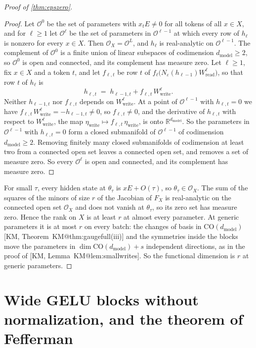 \documentclass[10pt]{article}
\makeatletter
\theoremstyle{definition}
\theoremstyle{remark}
\newcommand{\R}{\mathbb{R}}
\newcommand{\Wread}{W_{\mathrm{read}}}
\newcommand{\Wwrite}{W_{\mathrm{write}}}
\newcommand{\dm}{d_{\mathrm{model}}}
\newcommand{\CO}{\mathrm{CO}}
\newenvironment{nested}{\par\nopagebreak\def\FrameCommand{\hspace{0.5em}{\color{black!30}\vrule width 0.6pt}\hspace{1em}}\MakeFramed{\advance\hsize-\width\FrameRestore}}{\endMakeFramed}
\newcommand{\KMn}[1]{\csname KM@#1\endcsname}
\newcommand{\KM}[2]{[KM, #1~\KMn{#2}]}
\newcommand{\KMp}[3]{[KM, #1~\KMn{#2}(#3)]}
\makeatother
\begin{document}
\begin{proof}[Proof of \cref{thm:epszero}]
\begin{nested}
\begin{proof}
Let $\mathcal O^0$ be the set of parameters with $x_tE \neq 0$ for all tokens of all $x \in X$, and for $\ell \ge 1$ let $\mathcal O^\ell$ be the set of parameters in $\mathcal O^{\ell-1}$ at which every row of $h_\ell$ is nonzero for every $x \in X$. Then $\mathcal O_X = \mathcal O^L$, and $h_\ell$ is real-analytic on $\mathcal O^{\ell-1}$. The complement of $\mathcal O^0$ is a finite union of linear subspaces of codimension $\dm \ge 2$, so $\mathcal O^0$ is open and connected, and its complement has measure zero. Let $\ell \ge 1$, fix $x \in X$ and a token $t$, and let $f_{\ell,t}$ be row $t$ of $f_\ell\big(N_\varepsilon(h_{\ell-1})\Wread^{\ell}\big)$, so that row $t$ of $h_\ell$ is
\[
h_{\ell,t} \;=\; h_{\ell-1,t} + f_{\ell,t}\,\Wwrite^{\ell} .
\]
Neither $h_{\ell-1,t}$ nor $f_{\ell,t}$ depends on $\Wwrite^{\ell}$. At a point of $\mathcal O^{\ell-1}$ with $h_{\ell,t} = 0$ we have $f_{\ell,t}\,\Wwrite^{\ell} = -h_{\ell-1,t} \neq 0$, so $f_{\ell,t} \neq 0$, and the derivative of $h_{\ell,t}$ with respect to $\Wwrite^{\ell}$, the map $\eta_{\mathrm{write}} \mapsto f_{\ell,t}\,\eta_{\mathrm{write}}$, is onto $\R^{\dm}$. So the parameters in $\mathcal O^{\ell-1}$ with $h_{\ell,t} = 0$ form a closed submanifold of $\mathcal O^{\ell-1}$ of codimension $\dm \ge 2$. Removing finitely many closed submanifolds of codimension at least two from a connected open set leaves a connected open set, and removes a set of measure zero. So every $\mathcal O^\ell$ is open and connected, and its complement has measure zero.
\end{proof}
\end{nested}
For small $\tau$, every hidden state at $\theta_\tau$ is $xE + O(\tau)$, so $\theta_\tau \in \mathcal O_X$. The sum of the squares of the minors of size $r$ of the Jacobian of $F_X$ is real-analytic on the connected open set $\mathcal O_X$ and does not vanish at $\theta_\tau$, so its zero set has measure zero. Hence the rank on $X$ is at least $r$ at almost every parameter. At generic parameters it is at most $r$ on every batch: the changes of basis in $\CO(\dm)$ \KMp{Theorem}{thm:gaugefull}{iii} and the symmetries inside the blocks move the parameters in $\dim\CO(\dm) + s$ independent directions, as in the proof of \KM{Lemma}{lem:smallwrites}. So the functional dimension is $r$ at generic parameters.
\end{proof}

\section{Wide GELU blocks without normalization, and the theorem of Fefferman}\label{app:widegelu}
\end{document}

